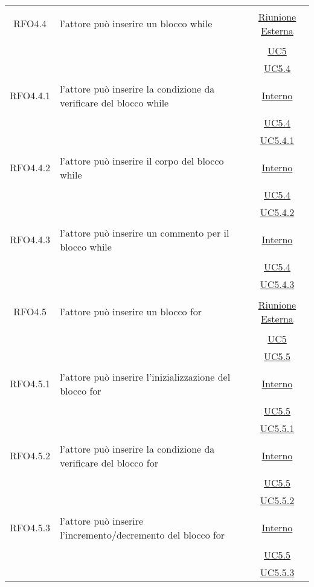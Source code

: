 \begin{longtable}{|c|>{\centering}m{7cm}|c|}
\hypertarget{RFO4.4}{RFO4.4} & l'attore può inserire un blocco while & \hyperlink{Riunione Esterna}{Riunione Esterna}\\
& &\hyperref[UC5]{UC5}\\
& &\hyperref[UC5.4]{UC5.4}\\ \hline

\hypertarget{RFO4.4.1}{RFO4.4.1} & l'attore può inserire la condizione da verificare del blocco while & \hyperlink{Interno}{Interno}\\
& &\hyperref[UC5.4]{UC5.4}\\
& &\hyperref[UC5.4.1]{UC5.4.1}\\ \hline

\hypertarget{RFO4.4.2}{RFO4.4.2} & l'attore può inserire il corpo del blocco while & \hyperlink{Interno}{Interno}\\
& &\hyperref[UC5.4]{UC5.4}\\
& &\hyperref[UC5.4.2]{UC5.4.2}\\ \hline

\hypertarget{RFO4.4.3}{RFO4.4.3} & l'attore può inserire un commento per il blocco while & \hyperlink{Interno}{Interno}\\
& &\hyperref[UC5.4]{UC5.4}\\
& &\hyperref[UC5.4.3]{UC5.4.3}\\ \hline

\hypertarget{RFO4.5}{RFO4.5} & l'attore può inserire un blocco for &  \hyperlink{Riunione Esterna}{Riunione Esterna}\\
& &\hyperref[UC5]{UC5}\\
& &\hyperref[UC5.5]{UC5.5}\\ \hline

\hypertarget{RFO4.5.1}{RFO4.5.1} & l'attore può inserire l'inizializzazione del blocco for & \hyperlink{Interno}{Interno}\\
& &\hyperref[UC5.5]{UC5.5}\\
& &\hyperref[UC5.5.1]{UC5.5.1}\\ \hline

\hypertarget{RFO4.5.2}{RFO4.5.2} & l'attore può inserire la condizione da verificare del blocco for & \hyperlink{Interno}{Interno}\\
& &\hyperref[UC5.5]{UC5.5}\\
& &\hyperref[UC5.5.2]{UC5.5.2}\\ \hline

\hypertarget{RFO4.5.3}{RFO4.5.3} & l'attore può inserire l'incremento/decremento del blocco for & \hyperlink{Interno}{Interno}\\
& &\hyperref[UC5.5]{UC5.5}\\
& &\hyperref[UC5.5.3]{UC5.5.3}\\ \hline


\end{longtable}
